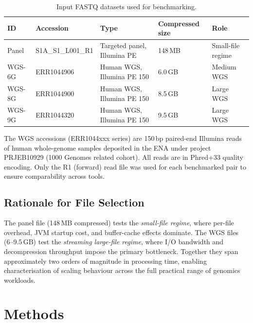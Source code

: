 \documentclass[a4paper,12pt]{article}
\begin{document}
\begin{table}[H]
  \centering
  \caption{Input FASTQ datasets used for benchmarking.}
  \label{tab:datasets}
  \begin{tabular}{lllll}
    \toprule
    \textbf{ID} & \textbf{Accession} & \textbf{Type} & \textbf{Compressed size} & \textbf{Role} \\
    \midrule
    Panel    & S1A\_S1\_L001\_R1  & Targeted panel, Illumina PE & 148\,MB  & Small-file regime \\
    WGS-6G   & ERR1044906         & Human WGS, Illumina PE 150  & 6.0\,GB  & Medium WGS \\
    WGS-8G   & ERR1044900         & Human WGS, Illumina PE 150  & 8.5\,GB  & Large WGS \\
    WGS-9G   & ERR1044320         & Human WGS, Illumina PE 150  & 9.5\,GB  & Large WGS \\
    \bottomrule
  \end{tabular}
\end{table}

\noindent
The WGS accessions (ERR1044xxx series) are 150\,bp paired-end Illumina reads
of human whole-genome samples deposited in the ENA under project PRJEB10929
(1000 Genomes related cohort).  All reads are in Phred+33 quality encoding.
Only the R1 (forward) read file was used for each benchmarked pair to ensure
comparability across tools.

\subsection{Rationale for File Selection}

The panel file (148\,MB compressed) tests the \emph{small-file regime}, where
per-file overhead, JVM startup cost, and buffer-cache effects dominate.  The
WGS files (6--9.5\,GB) test the \emph{streaming large-file regime}, where I/O
bandwidth and decompression throughput impose the primary bottleneck.  Together
they span approximately two orders of magnitude in processing time, enabling
characterisation of scaling behaviour across the full practical range of
genomics workloads.

\section{Methods}
\label{sec:methods}
\end{document}
